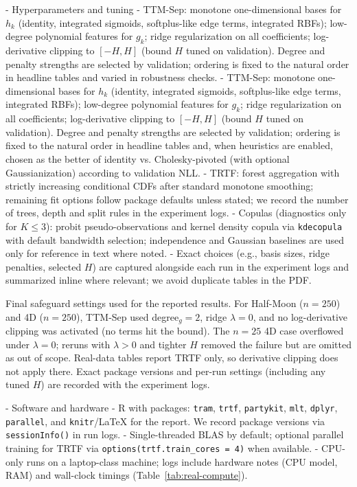 \documentclass[11pt,a4paper,twoside]{book}\usepackage[]{graphicx}\usepackage[]{xcolor}
\begin{document}
- Hyperparameters and tuning
  - TTM-Sep: monotone one-dimensional bases for $h_k$ (identity, integrated sigmoids, softplus-like edge terms, integrated RBFs); low-degree polynomial features for $g_k$; ridge regularization on all coefficients; log-derivative clipping to $[-H,H]$ (bound $H$ tuned on validation). Degree and penalty strengths are selected by validation; ordering is fixed to the natural order in headline tables and varied in robustness checks.
  - TTM-Sep: monotone one-dimensional bases for $h_k$ (identity, integrated sigmoids, softplus-like edge terms, integrated RBFs); low-degree polynomial features for $g_k$; ridge regularization on all coefficients; log-derivative clipping to $[-H,H]$ (bound $H$ tuned on validation). Degree and penalty strengths are selected by validation; ordering is fixed to the natural order in headline tables and, when heuristics are enabled, chosen as the better of identity vs. Cholesky-pivoted (with optional Gaussianization) according to validation NLL.
  - TRTF: forest aggregation with strictly increasing conditional CDFs after standard monotone smoothing; remaining fit options follow package defaults unless stated; we record the number of trees, depth and split rules in the experiment logs.
  - Copulas (diagnostics only for $K\le 3$): probit pseudo-observations and kernel density copula via \texttt{kdecopula} with default bandwidth selection; independence and Gaussian baselines are used only for reference in text where noted.
  - Exact choices (e.g., basis sizes, ridge penalties, selected $H$) are captured alongside each run in the experiment logs and summarized inline where relevant; we avoid duplicate tables in the PDF.

Final safeguard settings used for the reported results. For Half-Moon ($n=250$) and 4D ($n=250$), TTM-Sep used degree$_g=2$, ridge $\lambda=0$, and no log-derivative clipping was activated (no terms hit the bound). The $n=25$ 4D case overflowed under $\lambda=0$; reruns with $\lambda>0$ and tighter $H$ removed the failure but are omitted as out of scope. Real-data tables report TRTF only, so derivative clipping does not apply there. Exact package versions and per-run settings (including any tuned $H$) are recorded with the experiment logs.

- Software and hardware
  - R with packages: \texttt{tram}, \texttt{trtf}, \texttt{partykit}, \texttt{mlt}, \texttt{dplyr}, \texttt{parallel}, and \texttt{knitr}/LaTeX for the report. We record package versions via \texttt{sessionInfo()} in run logs.
  - Single-threaded BLAS by default; optional parallel training for TRTF via \texttt{options(trtf.train\_cores = 4)} when available.
  - CPU-only runs on a laptop-class machine; logs include hardware notes (CPU model, RAM) and wall-clock timings (Table~\ref{tab:real-compute}).
\end{document}
